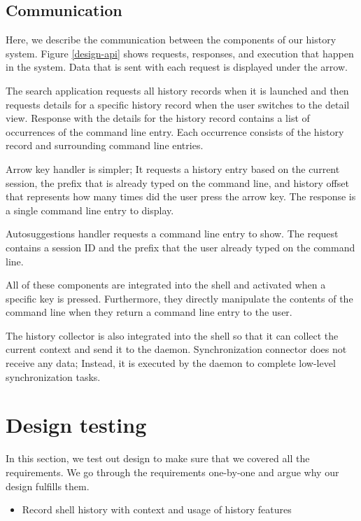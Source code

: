 \subsection{Communication}

Here, we describe the communication between the components of our history system. Figure \ref{design-api} shows requests, responses, and execution that happen in the system. Data that is sent with each request is displayed under the arrow. 

The search application requests all history records when it is launched and then requests details for a specific history record when the user switches to the detail view. Response with the details for the history record contains a list of occurrences of the command line entry. Each occurrence consists of the history record and surrounding command line entries.

Arrow key handler is simpler; It requests a history entry based on the current session, the prefix that is already typed on the command line, and history offset that represents how many times did the user press the arrow key. The response is a single command line entry to display.

Autosuggestions handler requests a command line entry to show. The request contains a session ID and the prefix that the user already typed on the command line.

All of these components are integrated into the shell and activated when a specific key is pressed. Furthermore, they directly manipulate the contents of the command line when they return a command line entry to the user.

The history collector is also integrated into the shell so that it can collect the current context and send it to the daemon. Synchronization connector does not receive any data; Instead, it is executed by the daemon to complete low-level synchronization tasks. 

\section{Design testing}

In this section, we test out design to make sure that we covered all the requirements. We go through the requirements one-by-one and argue why our design fulfills them. 

\begin{itemize}
\item Record shell history with context and usage of history features
\end{itemize}

